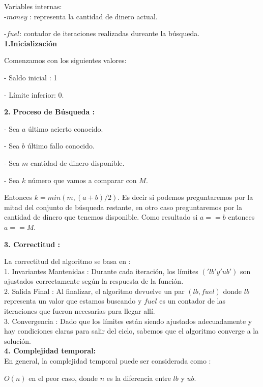 \documentclass[
10pt, %
a4paper, %
oneside, %
headinclude,footinclude, %
BCOR5mm, %
]{scrartcl}
\begin{document}
Variables internas: \\

-$money$ : representa la cantidad de dinero actual.

-$fuel$: contador de iteraciones realizadas dureante la búsqueda. \\

\textbf{1.Inicialización}
 
Comenzamos con los siguientes valores:

- Saldo inicial : 1


- Límite inferior: 0.

\textbf{2. Proceso de Búsqueda :} 

- Sea $a$ último acierto conocido.

- Sea $b$ último fallo conocido.

- Sea $m$ cantidad de dinero disponible.

- Sea $k$ número que vamos a comparar 
con $M$.


Entonces $k = min(m, (a+b)/2)$. Es 
decir si podemos preguntaremos por la 
mitad del conjunto de búsqueda 
restante, en otro caso preguntaremos 
por la cantidad de dinero que tenemos 
disponible. Como resultado si $a == b$ 
entonces $a == M$.


\textbf{3. Correctitud :} 

La correctitud del algoritmo se basa en : \\

1. Invariantes Mantenidas : Durante cada iteración, los límites $('lb' y 'ub')$ son ajustados correctamente según la respuesta de la función.\\

2. Salida Final : Al finalizar, el algoritmo devuelve un par $(lb, fuel)$ donde $lb$ representa un valor que estamos buscando y $fuel$ es un contador de las iteraciones 
que fueron necesarias para llegar allí.\\

3. Convergencia : Dado que los límites están siendo ajustados adecuadamente y hay condiciones claras para salir del ciclo, sabemos que el algoritmo converge a la solución. \\

\textbf{4. Complejidad temporal:} \\ 

En general, la complejidad temporal puede ser considerada como : 

$O(n)$ en el peor caso, donde $n$ es la diferencia entre $lb$ y $ub$. \\
\end{document}
